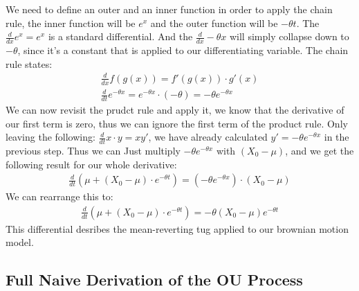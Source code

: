 \documentclass{article}
\begin{document}
\begin{spacing}{2.0}
We need to define an outer and an inner function in order to apply the chain rule, the inner function will be $e^{x}$ and the outer function will be $-\theta t$.
The $\frac{d}{dx}e^{x} = e^{x}$ is a standard differential. And the $\frac{d}{dx} -\theta x$ will simply collapse down to $-\theta$, since it's a constant that is
applied to our differentiating variable. The chain rule states:
\begin{gather*}
    \frac{d}{dx} f(g(x)) = f'(g(x)) \cdot g'(x) \\
    \frac{d}{dt} e^{-\theta x} = e^{-\theta x} \cdot (-\theta) = -\theta e^{-\theta x}
\end{gather*}
We can now revisit the prudct rule and apply it, we know that the derivative of our first term is zero, thus we can ignore the first term of the product rule.
Only leaving the following: $\frac{d}{dt}x \cdot y = xy'$, we have already calculated $y' = -\theta e^{-\theta x}$ in the previous step. Thus we can Just
multiply $-\theta e^{-\theta x}$ with $(X_{0} - \mu)$, and we get the following result for our whole derivative:
\begin{gather*}
    \frac{d}{dt} \left ( \mu + \left ( X_{0} - \mu \right ) \cdot e^{-\theta t} \right ) = (-\theta e^{-\theta x}) \cdot (X_{0} - \mu)
\end{gather*}
We can rearrange this to:
\begin{gather*}
    \frac{d}{dt} \left ( \mu + \left ( X_{0} - \mu \right ) \cdot e^{-\theta t} \right ) = -\theta (X_{0} - \mu) e^{-\theta t}
\end{gather*}
This differential desribes the mean-reverting tug applied to our brownian motion model.

\subsection{Full Naive Derivation of the OU Process}


\end{spacing}
\end{document}
